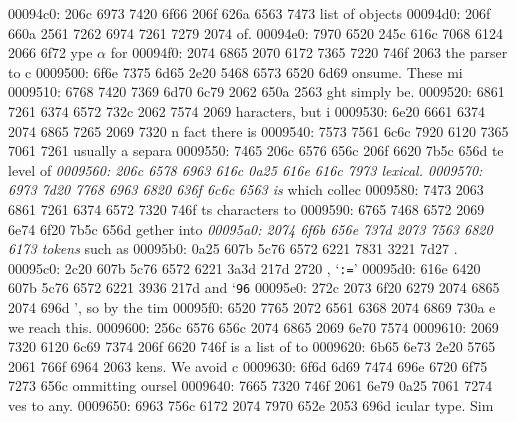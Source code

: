 \begin{bo
00010e0: 7865 647d 5c62 6567 696e 7b76 6572 6261  xed}
\begin{verba
00010f0: 7469 6d7d 0a20 2023 7479 7065 2074 6572  tim}
\begin{
0001c40: 7665 7262 6174 696d 7d0a 2020 236c 6574  verbatim}
\begin{boxe
00027a0: 647d 5c62 6567 696e 7b76 6572 6261 7469  d}
\begin{verbati
00027b0: 6d7d 0a20 2023 6c65 7420 696e 6669 7865  m}
\begin{v
0002c60: 6572 6261 7469 6d7d 0a20 2023 6c65 7420  erbatim}
\begin{
0002dc0: 7665 7262 6174 696d 7d0a 2020 236c 6574  verbatim}
\begin{boxed
0002f30: 7d5c 6265 6769 6e7b 7665 7262 6174 696d  }
\begin{verbatim
0002f40: 7d0a 2020 236c 6574 2068 6428 683a 3a74  }
\begin{v
0003e60: 6572 6261 7469 6d7d 0a20 2023 236f 7065  erbatim}
\begin{boxed
00042b0: 7d5c 6265 6769 6e7b 7665 7262 6174 696d  }
\begin{verbatim
00042c0: 7d0a 2020 2328 782c 7429 3b3b 0a20 202d  }
\begin{boxed}
00094c0: 206c 6973 7420 6f66 206f 626a 6563 7473   list of objects
00094d0: 206f 660a 2561 7262 6974 7261 7279 2074   of.%
00094e0: 7970 6520 245c 616c 7068 6124 2066 6f72  ype $\alpha$ for
00094f0: 2074 6865 2070 6172 7365 7220 746f 2063   the parser to c
0009500: 6f6e 7375 6d65 2e20 5468 6573 6520 6d69  onsume. These mi
0009510: 6768 7420 7369 6d70 6c79 2062 650a 2563  ght simply be.%
0009520: 6861 7261 6374 6572 732c 2062 7574 2069  haracters, but i
0009530: 6e20 6661 6374 2074 6865 7265 2069 7320  n fact there is 
0009540: 7573 7561 6c6c 7920 6120 7365 7061 7261  usually a separa
0009550: 7465 206c 6576 656c 206f 6620 7b5c 656d  te level of {\em
0009560: 206c 6578 6963 616c 0a25 616e 616c 7973   lexical.%
0009570: 6973 7d20 7768 6963 6820 636f 6c6c 6563  is} which collec
0009580: 7473 2063 6861 7261 6374 6572 7320 746f  ts characters to
0009590: 6765 7468 6572 2069 6e74 6f20 7b5c 656d  gether into {\em
00095a0: 2074 6f6b 656e 737d 2073 7563 6820 6173   tokens} such as
00095b0: 0a25 607b 5c76 6572 6221 7831 3221 7d27  .%
00095c0: 2c20 607b 5c76 6572 6221 3a3d 217d 2720  , `{\verb!:=!}' 
00095d0: 616e 6420 607b 5c76 6572 6221 3936 217d  and `{\verb!96!}
00095e0: 272c 2073 6f20 6279 2074 6865 2074 696d  ', so by the tim
00095f0: 6520 7765 2072 6561 6368 2074 6869 730a  e we reach this.
0009600: 256c 6576 656c 2074 6865 2069 6e70 7574  %
0009610: 2069 7320 6120 6c69 7374 206f 6620 746f   is a list of to
0009620: 6b65 6e73 2e20 5765 2061 766f 6964 2063  kens. We avoid c
0009630: 6f6d 6d69 7474 696e 6720 6f75 7273 656c  ommitting oursel
0009640: 7665 7320 746f 2061 6e79 0a25 7061 7274  ves to any.%
0009650: 6963 756c 6172 2074 7970 652e 2053 696d  icular type. Sim

\end{boxed}
\end{verbatim
00042c0: 7d0a 2020 2328 782c 7429 3b3b 0a20 202d  }
\end{boxed
00042b0: 7d5c 6265 6769 6e7b 7665 7262 6174 696d  }
\end{v
0003e60: 6572 6261 7469 6d7d 0a20 2023 236f 7065  erbatim}
\end{verbatim
0002f40: 7d0a 2020 236c 6574 2068 6428 683a 3a74  }
\end{boxed
0002f30: 7d5c 6265 6769 6e7b 7665 7262 6174 696d  }
\end{
0002dc0: 7665 7262 6174 696d 7d0a 2020 236c 6574  verbatim}
\end{v
0002c60: 6572 6261 7469 6d7d 0a20 2023 6c65 7420  erbatim}
\end{verbati
00027b0: 6d7d 0a20 2023 6c65 7420 696e 6669 7865  m}
\end{boxe
00027a0: 647d 5c62 6567 696e 7b76 6572 6261 7469  d}
\end{
0001c40: 7665 7262 6174 696d 7d0a 2020 236c 6574  verbatim}
\end{verba
00010f0: 7469 6d7d 0a20 2023 7479 7065 2074 6572  tim}
\end{bo
00010e0: 7865 647d 5c62 6567 696e 7b76 6572 6261  xed}

